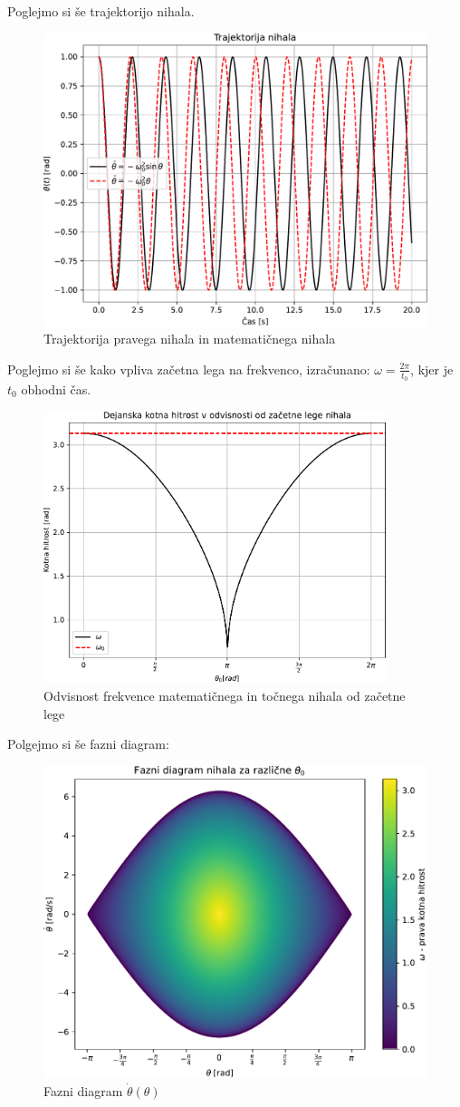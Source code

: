 \newpage 
Poglejmo si še trajektorijo nihala.
\begin{figure}[h]
    \centering
    \includegraphics[width=12cm]{pdfs/trajektorija.pdf}
    \caption{Trajektorija pravega nihala in matematičnega nihala}
\end{figure}
Poglejmo si še kako vpliva začetna lega na frekvenco, izračunano: $\omega = \frac{2\pi}{t_0}$, kjer je $t_0$
obhodni čas.
\begin{figure}[h]
    \centering
    \includegraphics[width=10cm]{pdfs/w(theta).pdf}
    \caption{Odvisnost frekvence matematičnega in točnega nihala od začetne lege}
\end{figure}
\newpage
Polgejmo si še fazni diagram:
\begin{figure}[h]
    \centering
    \includegraphics[width=\textwidth]{pdfs/fazni_dig.pdf}
    \caption{Fazni diagram $\dot{\theta}(\theta)$}
\end{figure}
